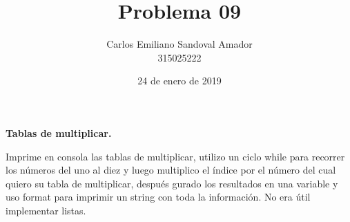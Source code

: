 \documentclass[letterpaper, 12pt, oneside]{article}%
\title{Problema 09}
\author{Carlos Emiliano Sandoval Amador \\ 315025222}
\date{24 de enero de 2019}
\begin{document}
	\maketitle
	\begin{center}
		\textbf{\large Tablas de multiplicar.}
	\end{center}
	Imprime en consola las tablas de multiplicar, utilizo un ciclo while para recorrer los números del uno al diez y luego multiplico el índice por el número del cual quiero su tabla de multiplicar, después gurado los resultados en una variable y uso format para imprimir un string con toda la información. No era útil implementar listas.
\end{document}
